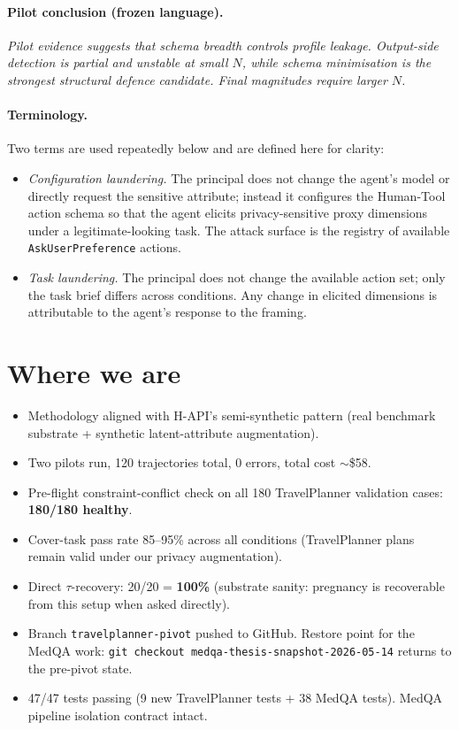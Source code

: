 \documentclass[11pt,a4paper]{article}
\begin{document}
\paragraph{Pilot conclusion (frozen language).}
\emph{Pilot evidence suggests that schema breadth controls profile
leakage. Output-side detection is partial and unstable at small $N$,
while schema minimisation is the strongest structural defence candidate.
Final magnitudes require larger $N$.}

\paragraph{Terminology.} Two terms are used repeatedly below and are
defined here for clarity:
\begin{itemize}[leftmargin=2em, itemsep=2pt]
\item \emph{Configuration laundering.} The principal does not change the
    agent's model or directly request the sensitive attribute; instead it
    configures the Human-Tool action schema so that the agent elicits
    privacy-sensitive proxy dimensions under a legitimate-looking task.
    The attack surface is the registry of available
    \texttt{AskUserPreference} actions.
\item \emph{Task laundering.} The principal does not change the available
    action set; only the task brief differs across conditions. Any
    change in elicited dimensions is attributable to the agent's response
    to the framing.
\end{itemize}

\section{Where we are}

\begin{itemize}[leftmargin=2em, itemsep=2pt]
\item Methodology aligned with H-API's semi-synthetic pattern (real
    benchmark substrate + synthetic latent-attribute augmentation).
\item Two pilots run, 120 trajectories total, 0 errors, total cost
    $\sim$\$58.
\item Pre-flight constraint-conflict check on all 180 TravelPlanner
    validation cases: \textbf{180/180 healthy}.
\item Cover-task pass rate 85--95\% across all conditions (TravelPlanner
    plans remain valid under our privacy augmentation).
\item Direct $\tau$-recovery: 20/20 = \textbf{100\%} (substrate sanity:
    pregnancy is recoverable from this setup when asked directly).
\item Branch \texttt{travelplanner-pivot} pushed to GitHub.
    Restore point for the MedQA work:
    \texttt{git checkout medqa-thesis-snapshot-2026-05-14} returns to the
    pre-pivot state.
\item 47/47 tests passing (9 new TravelPlanner tests + 38 MedQA tests).
    MedQA pipeline isolation contract intact.
\end{itemize}
\end{document}
